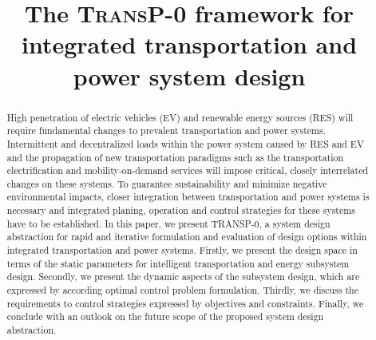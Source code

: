 \title{The \textsc{TransP-0} framework for integrated transportation and power system design}

\author{
	\and
}

\maketitle

\begin{abstract}
	High penetration of electric vehicles (EV) and renewable energy sources (RES) will require fundamental changes to prevalent transportation and power systems. Intermittent and decentralized loads within the power system caused by RES and EV and the propagation of new transportation paradigms such as the transportation electrification and mobility-on-demand services will impose critical, closely interrelated changes on these systems.
	To guarantee sustainability and minimize negative environmental impacts, closer integration between transportation and power systems is necessary and integrated planing, operation and control strategies for these systems have to be established. In this paper, we present TRANSP-0, a system design abstraction for rapid and iterative formulation and evaluation of design options within integrated transportation and power systems. Firstly, we present the design space in terms of the static parameters for intelligent transportation and energy subsystem design. Secondly, we present the dynamic aspects of the subsystem design, which are expressed by according optimal control problem formulation. Thirdly, we discuss the requirements to control strategies expressed by objectives and constraints. Finally, we conclude with an outlook on the future scope of the proposed system design abstraction.
	
\end{abstract}
